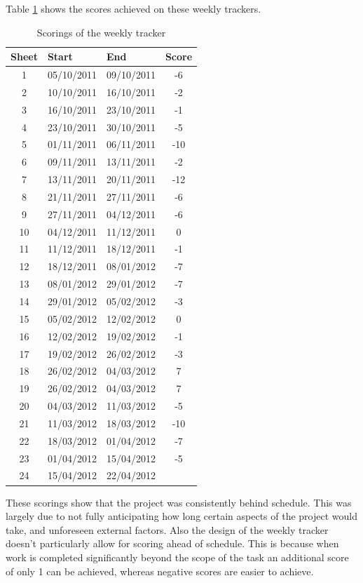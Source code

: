 Table \ref{tab:scorings} shows the scores achieved on these weekly trackers.
\begin{table}[H]
	\centering
	\begin{tabular}[c]{| c | l | l | c |}
		\hline
		Sheet	& Start	& End	& Score \\
		\hline
		1	& 05/10/2011	& 09/10/2011	& -6	\\
		2	& 10/10/2011	& 16/10/2011	& -2	\\
		3	& 16/10/2011	& 23/10/2011	& -1	\\
		4	& 23/10/2011	& 30/10/2011	& -5	\\
		5	& 01/11/2011	& 06/11/2011	& -10	\\
		6	& 09/11/2011	& 13/11/2011	& -2	\\
		7	& 13/11/2011	& 20/11/2011	& -12	\\
		8	& 21/11/2011	& 27/11/2011	& -6	\\
		9	& 27/11/2011	& 04/12/2011	& -6	\\
		10	& 04/12/2011	& 11/12/2011	& 0	\\
		11	& 11/12/2011	& 18/12/2011	& -1	\\
		12	& 18/12/2011	& 08/01/2012	& -7	\\
		13	& 08/01/2012	& 29/01/2012	& -7	\\
		14	& 29/01/2012	& 05/02/2012	& -3	\\
		15	& 05/02/2012	& 12/02/2012	& 0	\\
		16	& 12/02/2012	& 19/02/2012	& -1	\\
		17	& 19/02/2012	& 26/02/2012	& -3	\\
		18	& 26/02/2012	& 04/03/2012	& 7	\\
		19	& 26/02/2012	& 04/03/2012	& 7	\\
		20	& 04/03/2012	& 11/03/2012	& -5	\\
		21	& 11/03/2012	& 18/03/2012	& -10	\\
		22	& 18/03/2012	& 01/04/2012	& -7	\\
		23	& 01/04/2012	& 15/04/2012	& -5	\\
		24	& 15/04/2012	& 22/04/2012	& 	\\
		\hline
	\end{tabular}
	\caption{Scorings of the weekly tracker}
	\label{tab:scorings}
\end{table}

\noindent These scorings show that the project was consistently behind schedule.
This was largely due to not fully anticipating how long certain aspects of the project would take, and unforeseen external factors.
Also the design of the weekly tracker doesn't particularly allow for scoring ahead of schedule.
This is because when work is completed significantly beyond the scope of the task an additional score of only 1 can be achieved, whereas negative scores are easier to achieve.



